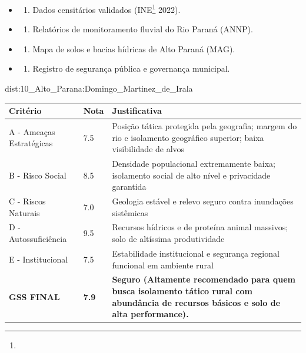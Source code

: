 {\begin{itemize}
\tightlist
\item
  \begin{enumerate}
  \def\labelenumi{\arabic{enumi})}
  \tightlist
  \item
    Dados censitários validados (INE\footnote{\fineINE} 2022).
  \end{enumerate}
\item
  \begin{enumerate}
  \def\labelenumi{\arabic{enumi})}
  \setcounter{enumi}{1}
  \tightlist
  \item
    Relatórios de monitoramento fluvial do Rio Paraná (ANNP).
  \end{enumerate}
\item
  \begin{enumerate}
  \def\labelenumi{\arabic{enumi})}
  \setcounter{enumi}{2}
  \tightlist
  \item
    Mapa de solos e bacias hídricas de Alto Paraná (MAG).
  \end{enumerate}
\item
  \begin{enumerate}
  \def\labelenumi{\arabic{enumi})}
  \setcounter{enumi}{3}
  \tightlist
  \item
    Registro de segurança pública e governança municipal.
  \end{enumerate}
\end{itemize}}{dist:10_Alto_Parana:Domingo_Martinez_de_Irala}
\begin{table}[ht!]
\small \begin{tabular}{p{3.0cm}p{0.8cm}p{6.0cm}} \toprule
\textbf{Critério} & \textbf{Nota} & \textbf{Justificativa} \\ \midrule
A - Ameaças Estratégicas & 7.5 & Posição tática protegida pela geografia; margem do rio e isolamento geográfico superior; baixa visibilidade de alvos \\
B - Risco Social & 8.5 & Densidade populacional extremamente baixa; isolamento social de alto nível e privacidade garantida \\
C - Riscos Naturais & 7.0 & Geologia estável e relevo seguro contra inundações sistêmicas \\
D - Autossuficiência & 9.5 & Recursos hídricos e de proteína animal massivos; solo de altíssima produtividade \\
E - Institucional & 7.5 & Estabilidade institucional e segurança regional funcional em ambiente rural \\
\midrule \textbf{GSS FINAL} & \textbf{7.9} & \textbf{Seguro (Altamente recomendado para quem busca isolamento tático rural com abundância de recursos básicos e solo de alta performance).} \\ \bottomrule \end{tabular}
\end{table}
